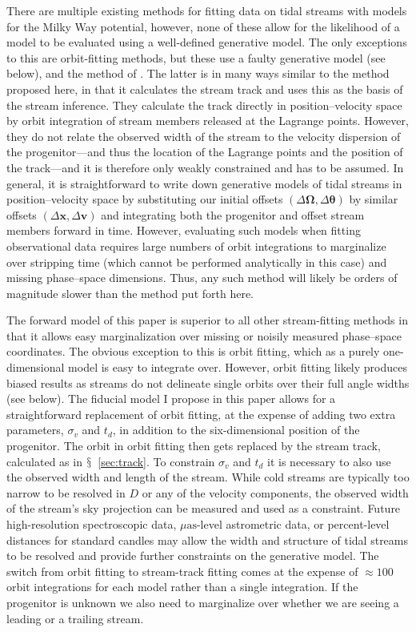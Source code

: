 \documentclass[12pt,preprint]{aastex}
\newcommand{\sectionname}{$\mathsection$}
\renewcommand{\vec}[1]{\ensuremath{\mathbf{#1}}}
\newcommand{\vecx}{\ensuremath{\vec{x}}}
\newcommand{\vecv}{\ensuremath{\vec{v}}}
\newcommand{\veco}{\ensuremath{\vec{\Omega}}}
\newcommand{\veca}{\ensuremath{\boldsymbol\theta}}
\newcommand{\sigv}{\ensuremath{\sigma_v}}
\begin{document}
There are multiple existing methods for fitting data on tidal streams
with models for the Milky Way potential, however, none of these allow
for the likelihood of a model to be evaluated using a well-defined
generative model. The only exceptions to this are orbit-fitting
methods, but these use a faulty generative model (see below), and the
method of \citet{Varghese11a}. The latter is in many ways similar to
the method proposed here, in that it calculates the stream track and
uses this as the basis of the stream inference. They calculate the
track directly in position--velocity space by orbit integration of
stream members released at the Lagrange points. However, they do not
relate the observed width of the stream to the velocity dispersion of
the progenitor---and thus the location of the Lagrange points and the
position of the track---and it is therefore only weakly constrained
and has to be assumed. In general, it is straightforward to write down
generative models of tidal streams in position--velocity space by
substituting our initial offsets $(\Delta \veco,\Delta \veca)$ by
similar offsets $(\Delta \vecx,\Delta \vecv)$ and integrating both the
progenitor and offset stream members forward in time. However,
evaluating such models when fitting observational data requires large
numbers of orbit integrations to marginalize over stripping time
(which cannot be performed analytically in this case) and missing
phase--space dimensions. Thus, any such method will likely be orders
of magnitude slower than the method put forth here.

The forward model of this paper is superior to all other
stream-fitting methods in that it allows easy marginalization over
missing or noisily measured phase--space coordinates. The obvious
exception to this is orbit fitting, which as a purely one-dimensional
model is easy to integrate over. However, orbit fitting likely
produces biased results as streams do not delineate single orbits over
their full angle widths (see below). The fiducial model I propose in
this paper allows for a straightforward replacement of orbit fitting,
at the expense of adding two extra parameters, $\sigv$ and $t_d$, in
addition to the six-dimensional position of the progenitor. The orbit
in orbit fitting then gets replaced by the stream track, calculated as
in \sectionname~\ref{sec:track}. To constrain $\sigv$ and $t_d$ it is
necessary to also use the observed width and length of the
stream. While cold streams are typically too narrow to be resolved in
$D$ or any of the velocity components, the observed width of the
stream's sky projection can be measured and used as a
constraint. Future high-resolution spectroscopic data,
$\mu\mathrm{as}$-level astrometric data, or percent-level distances
for standard candles may allow the width and structure of tidal
streams to be resolved and provide further constraints on the
generative model. The switch from orbit fitting to stream-track
fitting comes at the expense of $\approx100$ orbit integrations for
each model rather than a single integration. If the progenitor is
unknown we also need to marginalize over whether we are seeing a
leading or a trailing stream.
\end{document}
